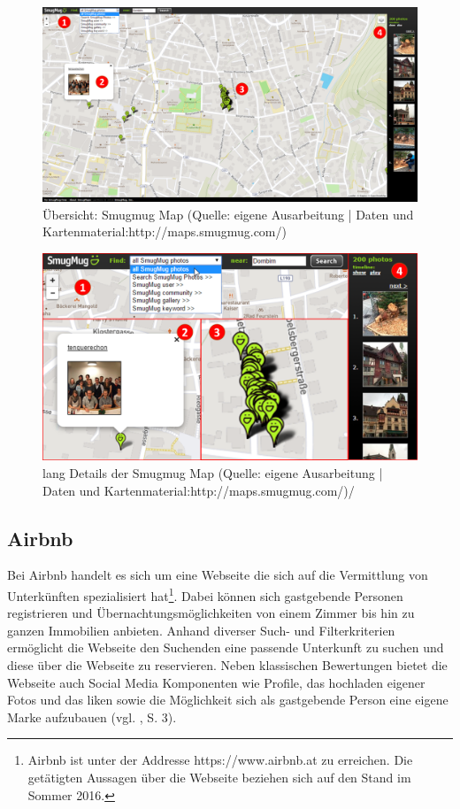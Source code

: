\documentclass[../Bachelorarbeit.tex]{subfiles}
\begin{document}
\begin{figure}[t!]
\centering
\includegraphics[width=1\linewidth]{img/StandDerTechnik/mapsSmugmugCom}
\caption[kurz]{Übersicht: Smugmug Map (Quelle: eigene Ausarbeitung | Daten und Kartenmaterial:http://maps.smugmug.com/)}
\label{fig:mapsSmugmugCom}
\end{figure}

\begin{figure}
\centering
\includegraphics[width=1\linewidth]{img/StandDerTechnik/mapsSmugmugComDetail}
\caption[kurz]{lang Details der Smugmug Map (Quelle: eigene Ausarbeitung | Daten und Kartenmaterial:http://maps.smugmug.com/)/}
\label{fig:mapsSmugmugComDetail}
\end{figure}

\subsection{Airbnb}
Bei Airbnb handelt es sich um eine Webseite die sich auf die Vermittlung von Unterkünften spezialisiert hat\footnote{
	Airbnb ist unter der Addresse https://www.airbnb.at zu erreichen. Die getätigten Aussagen über die Webseite beziehen sich auf den Stand im Sommer 2016.
	}. 
Dabei können sich gastgebende Personen registrieren und Übernachtungsmöglichkeiten von einem Zimmer bis hin zu ganzen Immobilien anbieten. 
Anhand diverser Such- und Filterkriterien ermöglicht die Webseite den Suchenden eine passende Unterkunft zu suchen und diese über die Webseite zu reservieren.
Neben klassischen Bewertungen bietet die Webseite auch Social Media Komponenten wie Profile, das hochladen eigener Fotos und das liken  sowie die Möglichkeit sich als gastgebende Person eine eigene Marke aufzubauen (vgl. \cite{Yannopoulou2013}, S. 3).
\end{document}
